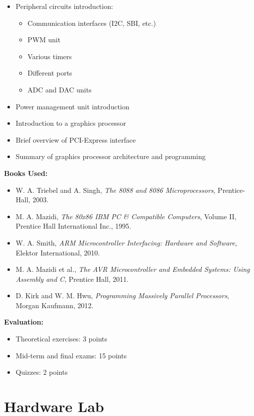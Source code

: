 \documentclass[12pt]{article}
\begin{document}
\begin{itemize}
    \item Peripheral circuits introduction:
    \begin{itemize}
        \item Communication interfaces (I2C, SBI, etc.)
        \item PWM unit
        \item Various timers
        \item Different ports
        \item ADC and DAC units
    \end{itemize}
    \item Power management unit introduction
    \item Introduction to a graphics processor
    \item Brief overview of PCI-Express interface
    \item Summary of graphics processor architecture and programming
\end{itemize}

\textbf{Books Used:}
\begin{itemize}
    \item W. A. Triebel and A. Singh, \textit{The 8088 and 8086 Microprocessors}, Prentice-Hall, 2003.
    \item M. A. Mazidi, \textit{The 80x86 IBM PC \& Compatible Computers}, Volume II, Prentice Hall International Inc., 1995.
    \item W. A. Smith, \textit{ARM Microcontroller Interfacing: Hardware and Software}, Elektor International, 2010.
    \item M. A. Mazidi et al., \textit{The AVR Microcontroller and Embedded Systems: Using Assembly and C}, Prentice Hall, 2011.
    \item D. Kirk and W. M. Hwu, \textit{Programming Massively Parallel Processors}, Morgan Kaufmann, 2012.
\end{itemize}

\textbf{Evaluation:}
\begin{itemize}
    \item Theoretical exercises: 3 points
    \item Mid-term and final exams: 15 points
    \item Quizzes: 2 points
\end{itemize}

\newpage

\section{Hardware Lab}
\end{document}
